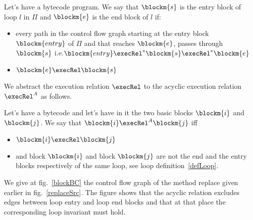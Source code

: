 
\begin{defn}
\label{defLoop}
Let's have a bytecode program. We say that $\blockm{s}$ is the entry block of loop $l$ in $\Pi$ and $\blockm{e}$ is the end block of $l$ if:
\begin{itemize}
\item every path in the control flow graph starting at the entry block $\blockm{entry}$ of $\Pi$ and that reaches $\blockm{e}$, passes through  $\blockm{s}$ 
  i.e.$ \blockm{entry} \execRel^{*}  \blockm{s} \execRel^{*} \blockm{e}$
\item $\blockm{e} \execRel \blockm{s}$
\end{itemize}
\end{defn}
We abstract the execution relation $\execRel$ to the acyclic execution relation $\execRel^A$ as follows. 

\begin{defn}
\label{acyclicExRel}
Let's have a bytecode and let's have in it the two basic blocks  $\blockm{i} $ and   $\blockm{j}$. We say 
that $\blockm{i} \execRel^A \blockm{j}$ iff
\begin{itemize}
\item $\blockm{i} \execRel \blockm{j}$
\item and block $\blockm{i}$ and block $\blockm{j}$ are not the end and the entry blocks respectively of the same loop, see loop definition~\ref{defLoop}.
\end{itemize}
\end{defn}

We give at fig.~\ref{blockBC} the control flow graph of the method replace given earlier in fig.~\ref{replaceSrc}. The figure shows that the acyclic relation
excludes edges between loop entry and loop end blocks and that at that place the corresponding loop invariant must hold.  

